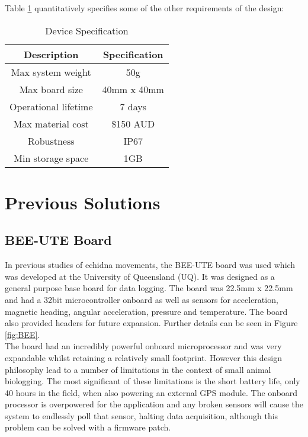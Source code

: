 \documentclass[12pt,openany,a4paper]{book}
\begin{document}
	Table \ref{tab:SPEC} quantitatively specifies some of the  other requirements of the design: \\
	\begin{table}[H]
		\centering
		\begin{adjustbox}{max width=\textwidth}
			\begin{tabular}{c | c }
				Description & Specification\\
				\hline
				Max system weight & 50g \\
				Max board size & 40mm x 40mm  \\
				Operational lifetime & 7 days \\
				Max material cost & \$150 AUD \\
				Robustness & IP67 \\
				Min storage space & 1GB
			\end{tabular}
		\end{adjustbox}
		\caption{Device Specification}
		\label{tab:SPEC}
	\end{table}
	
	\section{Previous Solutions}
		\subsection{BEE-UTE Board}
			In previous studies of echidna movements, the BEE-UTE board was used \cite{Freakley13} which was developed at the University of Queensland (UQ). It was designed as a general purpose base board for data logging. The board was 22.5mm x 22.5mm and had a 32bit microcontroller onboard as well as sensors for acceleration, magnetic heading, angular acceleration, pressure and temperature. The board also provided headers for future expansion. Further details can be seen in Figure \ref{fig:BEE}. \\
			
			 The board had an incredibly powerful onboard microprocessor and was very expandable whilst retaining a relatively small footprint. However this design philosophy lead to a number of limitations in the context of small animal biologging. The most significant of these limitations is the short battery life, only 40 hours in the field, when also powering an external GPS module. The onboard processor is overpowered for the application and any broken sensors will cause the system to endlessly poll that sensor, halting data acquisition, although this problem can be solved with a firmware patch. \\
			 
\end{document}
